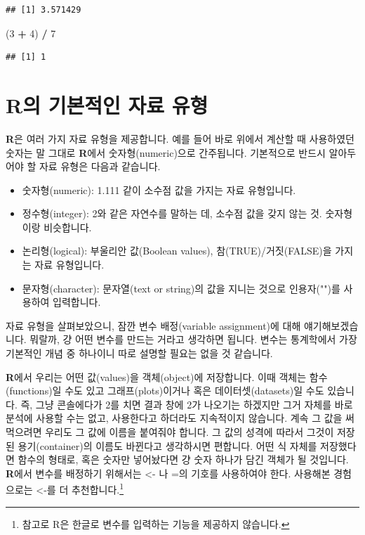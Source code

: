 \documentclass[]{book}
\newenvironment{Shaded}{\begin{snugshade}}{\end{snugshade}}
\newcommand{\DecValTok}[1]{\textcolor[rgb]{0.00,0.00,0.81}{#1}}
\newcommand{\NormalTok}[1]{#1}
\newcommand{\OperatorTok}[1]{\textcolor[rgb]{0.81,0.36,0.00}{\textbf{#1}}}
\newcommand{\StringTok}[1]{\textcolor[rgb]{0.31,0.60,0.02}{#1}}
\providecommand{\tightlist}{%
  \setlength{\itemsep}{0pt}\setlength{\parskip}{0pt}}
\let\rmarkdownfootnote\footnote%
\def\footnote{\protect\rmarkdownfootnote}
\begin{document}
\begin{itemize}
\begin{verbatim}
## [1] 3.571429
\end{verbatim}

\begin{Shaded}
\begin{Highlighting}[]
\NormalTok{(}\DecValTok{3} \OperatorTok{+}\StringTok{ }\DecValTok{4}\NormalTok{) }\OperatorTok{/}\StringTok{ }\DecValTok{7}
\end{Highlighting}
\end{Shaded}

\begin{verbatim}
## [1] 1
\end{verbatim}
\end{itemize}

\hypertarget{ruxc758-uxae30uxbcf8uxc801uxc778-uxc790uxb8cc-uxc720uxd615}{%
\section{\texorpdfstring{\textbf{R}의 기본적인 자료 유형}{R의 기본적인 자료 유형}}\label{ruxc758-uxae30uxbcf8uxc801uxc778-uxc790uxb8cc-uxc720uxd615}}

\textbf{R}은 여러 가지 자료 유형을 제공합니다. 예를 들어 바로 위에서 계산할 때 사용하였던 숫자는 말 그대로 \textbf{R}에서 숫자형(numeric)으로 간주됩니다. 기본적으로 반드시 알아두어야 할 자료 유형은 다음과 같습니다.

\begin{itemize}
\tightlist
\item
  숫자형(numeric): 1.111 같이 소수점 값을 가지는 자료 유형입니다.
\item
  정수형(integer): 2와 같은 자연수를 말하는 데, 소수점 값을 갖지 않는 것. 숫자형이랑 비슷합니다.
\item
  논리형(logical): 부울리안 값(Boolean values), 참(TRUE)/거짓(FALSE)을 가지는 자료 유형입니다.
\item
  문자형(character): 문자열(text or string)의 값을 지니는 것으로 인용자("")를 사용하여 입력합니다.
\end{itemize}

자료 유형을 살펴보았으니, 잠깐 변수 배정(variable assignment)에 대해 얘기해보겠습니다. 뭐랄까, 걍 어떤 변수를 만드는 거라고 생각하면 됩니다. 변수는 통계학에서 가장 기본적인 개념 중 하나이니 따로 설명할 필요는 없을 것 같습니다.

\textbf{R}에서 우리는 어떤 값(values)을 객체(object)에 저장합니다. 이때 객체는 함수(functions)일 수도 있고 그래프(plots)이거나 혹은 데이터셋(datasets)일 수도 있습니다. 즉, 그냥 콘솔에다가 2를 치면 결과 창에 2가 나오기는 하겠지만 그거 자체를 바로 분석에 사용할 수는 없고, 사용한다고 하더라도 지속적이지 않습니다. 계속 그 값을 써먹으려면 우리도 그 값에 이름을 붙여줘야 합니다. 그 값의 성격에 따라서 그것이 저장된 용기(container)의 이름도 바뀐다고 생각하시면 편합니다. 어떤 식 자체를 저장했다면 함수의 형태로, 혹은 숫자만 넣어놨다면 걍 숫자 하나가 담긴 객체가 될 것입니다. \textbf{R}에서 변수를 배정하기 위해서는 \textless{}- 나 =의 기호를 사용하여야 한다. 사용해본 경험으로는 \textless{}-를 더 추천합니다.\footnote{참고로 R은 한글로 변수를 입력하는 기능을 제공하지 않습니다.}
\end{document}
